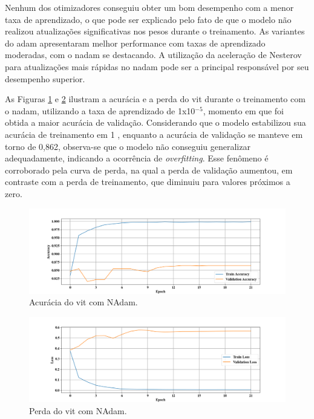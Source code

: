 Nenhum dos otimizadores conseguiu obter um bom desempenho com a menor taxa de aprendizado, o que pode ser explicado pelo fato de que o modelo não realizou atualizações significativas nos pesos durante o treinamento.
As variantes do \acrshort{adam} apresentaram melhor performance com taxas de aprendizado moderadas, com o \acrshort{nadam} se destacando.
A utilização da aceleração de Nesterov para atualizações mais rápidas no \acrshort{nadam} pode ser a principal responsável por seu desempenho superior.

As Figuras \ref{fig:nadam_acc} e \ref{fig:nadam_loss} ilustram a acurácia e a perda do \acrshort{vit} durante o treinamento com o \acrshort{nadam}, utilizando a taxa de aprendizado de 1x10$^{-5}$, momento em que foi obtida a maior acurácia de validação.
Considerando que o modelo estabilizou sua acurácia de treinamento em 1 , enquanto a acurácia de validação se manteve em torno de 0,862, observa-se que o modelo não conseguiu generalizar adequadamente, indicando a ocorrência de \textit{overfitting}.
Esse fenômeno é corroborado pela curva de perda, na qual a perda de validação aumentou, em contraste com a perda de treinamento, que diminuiu para valores próximos a zero.

\begin{figure}[tb]
\centerline{\includegraphics[width=1\linewidth]{images/resultados/nadam_accuracy.png}}
\caption{Acurácia do \acrshort{vit} com NAdam.}
\label{fig:nadam_acc}
\end{figure}

\begin{figure}[tb]
\centerline{\includegraphics[width=1\linewidth]{images/resultados/nadam_loss.png}}
\caption{Perda do \acrshort{vit} com NAdam.}
\label{fig:nadam_loss}
\end{figure}

